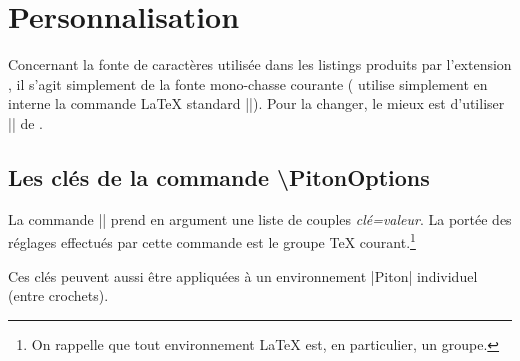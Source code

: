 \documentclass[dvipsnames,svgnames]{article}
\begin{document}
\section{Personnalisation}

Concernant la fonte de caractères utilisée dans les listings produits par l'extension , il s'agit
simplement de la fonte mono-chasse courante ( utilise simplement en interne la commande LaTeX standard
|\ttfamily|). Pour la changer, le mieux est d'utiliser |\setmonofont| de .

\subsection{Les clés de la commande \textbackslash PitonOptions}



La commande |\PitonOptions| prend en argument une liste de couples \textsl{clé=valeur}. La portée des réglages
effectués par cette commande est le groupe TeX courant.\footnote{On rappelle que tout environnement LaTeX est, en
  particulier, un groupe.}

Ces clés peuvent aussi être appliquées à un environnement |{Piton}| individuel (entre crochets).
\end{document}
